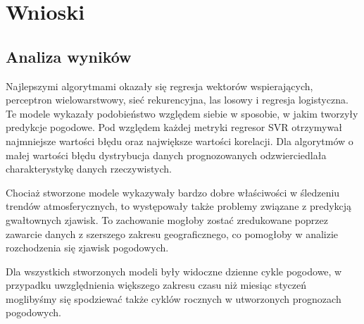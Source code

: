


\section{Wnioski}

\subsection{Analiza wyników}

Najlepszymi algorytmami okazały się regresja wektorów wspierających, perceptron
wielowarstwowy, sieć rekurencyjna, las losowy i regresja logistyczna. Te modele
wykazały podobieństwo względem siebie w sposobie, w jakim tworzyły predykcje 
pogodowe. Pod względem każdej metryki regresor SVR otrzymywał najmniejsze 
wartości błędu oraz największe wartości korelacji. Dla algorytmów 
o małej wartości błędu dystrybucja danych prognozowanych odzwierciedlała
charakterystykę danych rzeczywistych.

Chociaż stworzone modele wykazywały bardzo dobre właściwości w śledzeniu
trendów atmosferycznych, to występowały także problemy związane z 
predykcją gwałtownych zjawisk. To zachowanie mogłoby zostać zredukowane
poprzez zawarcie danych z szerszego zakresu geograficznego, co pomogłoby 
w analizie rozchodzenia się zjawisk pogodowych. 

Dla wszystkich stworzonych modeli były widoczne dzienne cykle pogodowe, w przypadku
uwzględnienia większego zakresu czasu niż miesiąc styczeń moglibyśmy się spodziewać
także cyklów rocznych w utworzonych prognozach pogodowych.

